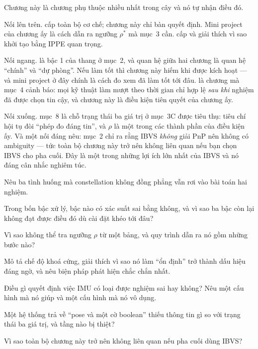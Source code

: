 \documentclass[../../marker.tex]{subfiles}
\begin{document}
Chương này là chương phụ thuộc nhiều nhất trong cây và nó tự nhận điều đó.

Nối lên trên.  cấp toàn bộ cơ chế; chương này chỉ bàn quyết định. Mini project của chương ấy là cách dẫn ra ngưỡng \(\rho^*\) mà mục~3 cần.  cấp  và giải thích vì sao khởi tạo bằng IPPE quan trọng.

Nối ngang.  là bậc 1 của thang ở mục~2, và quan hệ giữa hai chương là quan hệ ``chính'' và ``dự phòng''. Nếu  làm tốt thì chương này hiếm khi được kích hoạt --- và mini project ở đây chính là cách đo xem  đã làm tốt tới đâu.  là chương mà mục~4 cảnh báo: mọi kỹ thuật làm mượt theo thời gian chỉ hợp lệ \emph{sau khi} nghiệm đã được chọn tin cậy, và chương này là điều kiện tiên quyết của chương ấy.

Nối xuống.  mục~8 là chỗ trạng thái ba giá trị ở mục~3C được tiêu thụ: tiêu chí hội tụ đòi ``phép đo đáng tin'', và \(\rho\) là một trong các thành phần của điều kiện ấy. Và một nối đáng nêu:  mục~2 chỉ ra rằng IBVS \emph{không} giải PnP nên không có ambiguity --- tức toàn bộ chương này trở nên không liên quan nếu bạn chọn IBVS cho pha cuối. Đây là một trong những lợi ích lớn nhất của IBVS và nó đáng cân nhắc nghiêm túc.

\begin{tukiem}
\item Nêu ba tình huống mà constellation không đồng phẳng vẫn rơi vào bài toán hai nghiệm.
\item Trong bốn bậc xử lý, bậc nào có xác suất sai bằng không, và vì sao ba bậc còn lại không đạt được điều đó dù cài đặt khéo tới đâu?
\item Vì sao không thể tra ngưỡng \(\rho\) từ một bảng, và quy trình dẫn ra nó gồm những bước nào?
\item Mô tả chế độ khoá cứng, giải thích vì sao nó làm ``ổn định'' trở thành dấu hiệu đáng ngờ, và nêu biện pháp phát hiện chắc chắn nhất.
\item Điều gì quyết định việc IMU có loại được nghiệm sai hay không? Nêu một cấu hình mà nó giúp và một cấu hình mà nó vô dụng.
\item Một hệ thống trả về ``pose và một cờ boolean'' thiếu thông tin gì so với trạng thái ba giá trị, và tầng nào bị thiệt?
\item Vì sao toàn bộ chương này trở nên không liên quan nếu pha cuối dùng IBVS?
\end{tukiem}
\ifSubfilesClassLoaded{\printbibliography[title={Nguồn}]}{}
\end{document}
